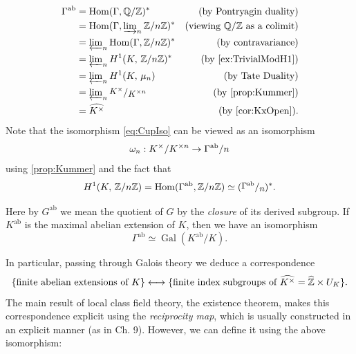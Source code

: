 \documentclass[a4paper, oneside]{memoir}
\begin{document}
\begin{align*}
	\Gamma^{\text{ab}} & = \Hom(\Gamma, \Q/\Z)^*                                    & \text{(by Pontryagin duality)}        \\
	                   & = \Hom(\Gamma, \varinjlim_n\nolimits \Zn)^*                & \text{(viewing $\Q/\Z$ as a colimit)} \\
	                   & = \varprojlim_n\nolimits \Hom(\Gamma, \Zn)^*               & \text{(by contravariance)}            \\
	                   & = \varprojlim_n\nolimits \H{1}{K}{\Zn}^*                   & \text{(by \ref{ex:TrivialModH1})}     \\
	                   & = \varprojlim_n\nolimits \H{1}{K}{\mu_n}                   & \text{(by Tate Duality)}              \\
	                   & = \varprojlim_n\nolimits \sfrac{K^{\times}}{\K^{\times n}} & \text{(by \ref{prop:Kummer})}        \\
	                   & = \widehat{\K^\times}                                      & \text{(by \ref{cor:KxOpen})}.
\end{align*}
Note that the isomorphism \eqref{eq:CupIso} can be viewed as an isomorphism
	\begin{equation}\label{eq:RecIso}
		\omega_n:K^\times / K^{\times n} \to \Gamma^{\text{ab}}/n
	\end{equation}
	using \eqref{prop:Kummer} and the fact that \[\H{1}{\K}{\Zn}=
		\Hom(\Gamma^{\text{ab}},\Zn)\simeq(\sfrac{\Gamma^{\text{ab}}}{n})^*.\]

\begin{remark}
	Here by $G^{\text{ab}}$ we mean the quotient of $G$ by the \textit{closure} of its derived subgroup. If $K^{\text{ab}}$ is the maximal abelian extension of $K$, then we have an isomorphism
	\[
		\Gamma^{\text{ab}} \simeq \operatorname{Gal}(K^{\text{ab}}/K).
	\]
\end{remark}
\noindent In particular, passing through Galois theory we deduce a correspondence
\begin{equation}\label{eq:ClassField}
	\{\text{finite abelian extensions of }K\} \longleftrightarrow \{\text{finite index subgroups of }\widehat{K^\times} = \widehat{\mathbb{Z}} \times U_K\}
	.\end{equation}
The main result of local class field theory, the existence theorem, makes this correspondence explicit using the \textit{reciprocity map}, which is usually constructed in an explicit manner (as in \cite{Harari} Ch. 9). However, we can define it using the above isomorphism:
\end{document}
